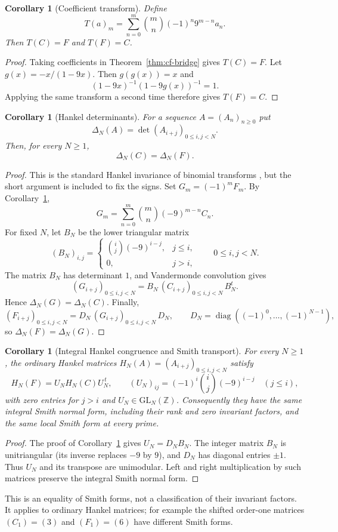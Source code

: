\documentclass[11pt,a4paper]{article}
\newtheorem{corollary}[theorem]{Corollary}
\begin{document}
\begin{corollary}[Coefficient transform]
\label{cor:coeff}
Define
\[
  T(a)_m=\sum_{n=0}^m\binom{m}{n}(-1)^n9^{m-n}a_n.
\]
Then $T(C)=F$ and $T(F)=C$.
\end{corollary}

\begin{proof}
Taking coefficients in Theorem~\ref{thm:cf-bridge} gives $T(C)=F$.  Let
$g(x)=-x/(1-9x)$.  Then $g(g(x))=x$ and
\[
  (1-9x)^{-1}(1-9g(x))^{-1}=1.
\]
Applying the same transform a second time therefore gives $T(F)=C$.
\end{proof}

\begin{corollary}[Hankel determinants]
\label{cor:hankel}
For a sequence $A=(A_n)_{n\geq0}$ put
\[
  \Delta_N(A)=\det(A_{i+j})_{0\leq i,j<N}.
\]
Then, for every $N\geq1$,
\[
  \Delta_N(C)=\Delta_N(F).
\]
\end{corollary}

\begin{proof}
This is the standard Hankel invariance of binomial transforms
\cite{spivey_steil_2006_k_binomial}, but the short argument is included to
fix the signs.  Set $G_m=(-1)^mF_m$.  By Corollary~\ref{cor:coeff},
\[
  G_m=\sum_{n=0}^m\binom{m}{n}(-9)^{m-n}C_n.
\]
For fixed $N$, let $B_N$ be the lower triangular matrix
\[
  (B_N)_{i,j}=
  \begin{cases}
    \binom{i}{j}(-9)^{i-j},& j\leq i,\\
    0,& j>i,
  \end{cases}
  \qquad 0\leq i,j<N.
\]
The matrix $B_N$ has determinant $1$, and Vandermonde convolution gives
\[
  (G_{i+j})_{0\leq i,j<N}
  =
  B_N\,(C_{i+j})_{0\leq i,j<N}\,B_N^{t}.
\]
Hence $\Delta_N(G)=\Delta_N(C)$.  Finally,
\[
  (F_{i+j})_{0\leq i,j<N}
  =
  D_N\,(G_{i+j})_{0\leq i,j<N}\,D_N,
  \qquad D_N=\operatorname{diag}((-1)^0,\ldots,(-1)^{N-1}),
\]
so $\Delta_N(F)=\Delta_N(G)$.
\end{proof}

\begin{corollary}[Integral Hankel congruence and Smith transport]
\label{cor:smith-transport}
For every $N\geq1$, the ordinary Hankel matrices
$H_N(A)=(A_{i+j})_{0\leq i,j<N}$ satisfy
\[
 H_N(F)=U_NH_N(C)U_N^{\,t},\qquad
 (U_N)_{ij}=(-1)^i\binom{i}{j}(-9)^{i-j}\quad (j\leq i),
\]
with zero entries for $j>i$ and $U_N\in\mathrm{GL}_N(\mathbb Z)$.
Consequently they have the same integral Smith normal form, including their
rank and zero invariant factors, and the same local Smith form at every prime.
\end{corollary}
\begin{proof}
The proof of Corollary~\ref{cor:hankel} gives $U_N=D_NB_N$.
The integer matrix $B_N$ is unitriangular (its inverse replaces $-9$ by $9$),
and $D_N$ has diagonal entries $\pm1$.  Thus $U_N$ and its transpose are
unimodular.  Left and right multiplication by such matrices preserve the
integral Smith normal form.
\end{proof}
This is an equality of Smith forms, not a classification of their invariant
factors.  It applies to ordinary Hankel matrices; for example the shifted
order-one matrices $(C_1)=(3)$ and $(F_1)=(6)$ have different Smith forms.
\end{document}
